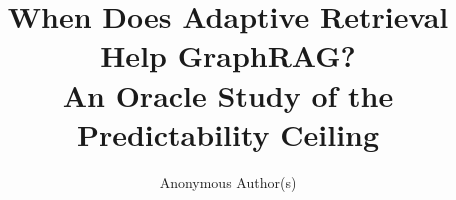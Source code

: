 \documentclass[sigconf,review,anonymous]{acmart}
\begin{document}
\title[The Predictability Ceiling of Adaptive GraphRAG]{When Does Adaptive Retrieval Help GraphRAG?\\An Oracle Study of the Predictability Ceiling}

\author{Anonymous Author(s)}

\begin{abstract}

\end{abstract}

\maketitle







\FloatBarrier




\end{document}
